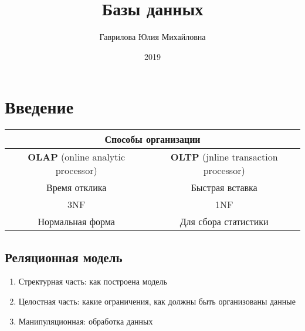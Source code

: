 \documentclass[a4paper, 14pt]{report}
\author{Гаврилова Юлия Михайловна}
\title{Базы данных}
\date{2019}
\begin{document}
    \maketitle

    \tableofcontents
    \clearpage

    \chapter{Введение}

    \begin{center}
    \begin{tabular}{|c|c|}
        \hline
        \multicolumn{2}{|c|}{Способы организации} \\
        \hline
        \textbf{OLAP} (online analytic processor) & \textbf{OLTP} (jnline transaction processor) \\
        \hline
        Время отклика & Быстрая вставка \\
        \hline
        3NF & 1NF \\
        \hline
        Нормальная форма & Для сбора статистики \\
        \hline
    \end{tabular}
    \end{center}


    \hfill


    \section{Реляционная модель}

    \begin{enumerate}
        \item Стректурная часть: как построена модель
        \item Целостная часть: какие ограничения, как должны быть организованы данные
        \item Манипуляционная: обработка данных
    \end{enumerate}
\end{document}
